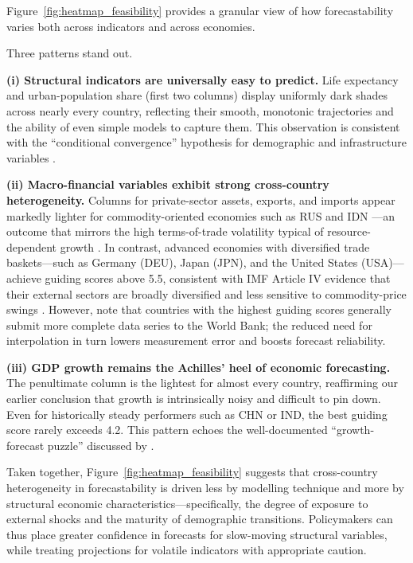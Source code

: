 \documentclass[12pt]{article}
\begin{document}
Figure~\ref{fig:heatmap_feasibility} provides a granular view of how forecastability varies both across indicators and across economies.

Three patterns stand out. 

\textbf{(i) Structural indicators are universally easy to predict.} Life expectancy and urban-population share (first two columns) display uniformly dark shades across nearly every country, reflecting their smooth, monotonic trajectories and the ability of even simple models to capture them. This observation is consistent with the “conditional convergence” hypothesis for demographic and infrastructure variables \cite{Barro1992Convergence}.

\textbf{(ii) Macro-financial variables exhibit strong cross-country heterogeneity.} Columns for private-sector assets, exports, and imports appear markedly lighter for commodity-oriented economies such as RUS \cite{Prebisch1950, SachsWarner2001} and IDN \cite{VanDerPloegPoelhekke2009} —an outcome that mirrors the high terms-of-trade volatility typical of resource-dependent growth \cite{Prebisch1950}. 
In contrast, advanced economies with diversified trade baskets—such as Germany (DEU), Japan (JPN), and the United States (USA)—achieve guiding scores above 5.5, consistent with IMF Article IV evidence that their external sectors are broadly diversified and less sensitive to commodity-price swings \cite{IMF2023Germany, IMF2023Japan, IMF2023USA}.
However, note that countries with the highest guiding scores generally submit more complete data series to the World Bank; the reduced need for interpolation in turn lowers measurement error and boosts forecast reliability.

\textbf{(iii) GDP growth remains the Achilles’ heel of economic forecasting.} The penultimate column is the lightest for almost every country, reaffirming our earlier conclusion that growth is intrinsically noisy and difficult to pin down. Even for historically steady performers such as CHN or IND, the best guiding score rarely exceeds 4.2. This pattern echoes the well-documented “growth-forecast puzzle” discussed by \cite{Loungani2001}.

Taken together, Figure~\ref{fig:heatmap_feasibility} suggests 
that cross-country heterogeneity in forecastability is driven
 less by modelling technique and more by structural economic 
 characteristics—specifically, the degree of exposure to external 
 shocks and the maturity of demographic transitions. Policymakers 
 can thus place greater confidence in forecasts for slow-moving 
 structural variables, while treating projections for volatile 
 indicators with appropriate caution.
\end{document}
